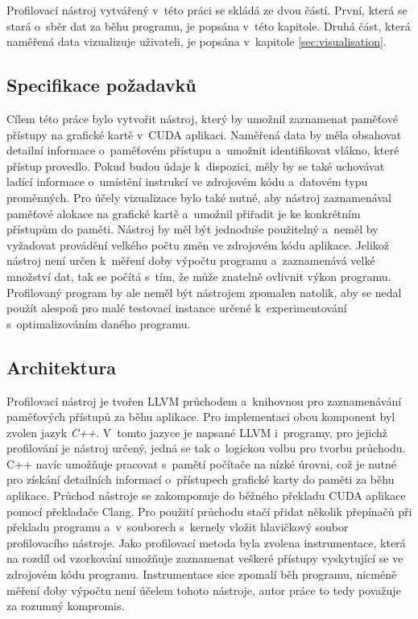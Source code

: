 Profilovací nástroj vytvářený v~této práci se skládá ze dvou částí. První, která se stará o~sběr dat za běhu programu, je popsána v~této kapitole. Druhá část, která naměřená data vizualizuje uživateli, je popsána v~kapitole \ref{sec:visualisation}.

\subsection{Specifikace požadavků}
Cílem této práce bylo vytvořit nástroj, který by umožnil zaznamenat paměťové přístupy na grafické kartě v~CUDA aplikaci. Naměřená data by měla obsahovat detailní informace o~paměťovém přístupu a~umožnit identifikovat vlákno, které přístup provedlo. Pokud budou údaje k~dispozici, měly by se také uchovávat ladící informace o~umístění instrukcí ve zdrojovém kódu a~datovém typu proměnných.
Pro účely vizualizace bylo také nutné, aby nástroj zaznamenával paměťové alokace na grafické kartě a~umožnil přiřadit je ke konkrétním přístupům do paměti.
Nástroj by měl být jednoduše použitelný a~neměl by vyžadovat provádění velkého počtu změn ve zdrojovém kódu aplikace. Jelikož nástroj není určen k~měření doby výpočtu programu a~zaznamenává velké množství dat, tak se počítá s~tím, že může znatelně ovlivnit výkon programu. Profilovaný program by ale neměl být nástrojem zpomalen natolik, aby se nedal použít alespoň pro malé testovací instance určené k~experimentování s~optimalizováním daného programu.

\subsection{Architektura}
Profilovací nástroj je tvořen LLVM průchodem a~knihovnou pro zaznamenávání paměťových přístupů za běhu aplikace. Pro implementaci obou komponent byl zvolen jazyk \emph{C++}. V~tomto jazyce je napsané LLVM i~programy, pro jejichž profilování je nástroj určený, jedná se tak o~logickou volbu pro tvorbu průchodu. C++ navíc umožňuje pracovat s~pamětí počítače na nízké úrovni, což je nutné pro získání detailních informací o~přístupech grafické karty do paměti za běhu aplikace.
Průchod nástroje se zakomponuje do běžného překladu CUDA aplikace pomocí překladače Clang. Pro použití průchodu stačí přidat několik přepínačů při překladu programu a~v~souborech s~kernely vložit hlavičkový soubor profilovacího nástroje. 
Jako profilovací metoda byla zvolena instrumentace, která na rozdíl od vzorkování umožňuje zaznamenat veškeré přístupy vyskytující se ve zdrojovém kódu programu. Instrumentace sice zpomalí běh programu, nicméně měření doby výpočtu není účelem tohoto nástroje, autor práce to tedy považuje za rozumný kompromis.

